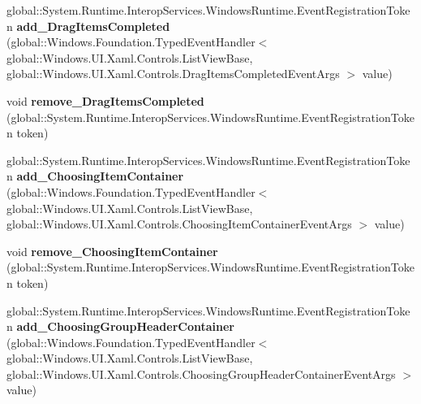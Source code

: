 \begin{DoxyCompactItemize}
\item 
\mbox{\label{interface_windows_1_1_u_i_1_1_xaml_1_1_controls_1_1_i_list_view_base4_a8ded6e3ecc87209cec3cfd04f4282042}} 
global\+::\+System.\+Runtime.\+Interop\+Services.\+Windows\+Runtime.\+Event\+Registration\+Token {\bfseries add\+\_\+\+Drag\+Items\+Completed} (global\+::\+Windows.\+Foundation.\+Typed\+Event\+Handler$<$ global\+::\+Windows.\+U\+I.\+Xaml.\+Controls.\+List\+View\+Base, global\+::\+Windows.\+U\+I.\+Xaml.\+Controls.\+Drag\+Items\+Completed\+Event\+Args $>$ value)
\item 
\mbox{\label{interface_windows_1_1_u_i_1_1_xaml_1_1_controls_1_1_i_list_view_base4_aa8eed7aa7eefe8deffed7275d822d4ea}} 
void {\bfseries remove\+\_\+\+Drag\+Items\+Completed} (global\+::\+System.\+Runtime.\+Interop\+Services.\+Windows\+Runtime.\+Event\+Registration\+Token token)
\item 
\mbox{\label{interface_windows_1_1_u_i_1_1_xaml_1_1_controls_1_1_i_list_view_base4_a50b9a86d32b7a6ba60f5162b251de868}} 
global\+::\+System.\+Runtime.\+Interop\+Services.\+Windows\+Runtime.\+Event\+Registration\+Token {\bfseries add\+\_\+\+Choosing\+Item\+Container} (global\+::\+Windows.\+Foundation.\+Typed\+Event\+Handler$<$ global\+::\+Windows.\+U\+I.\+Xaml.\+Controls.\+List\+View\+Base, global\+::\+Windows.\+U\+I.\+Xaml.\+Controls.\+Choosing\+Item\+Container\+Event\+Args $>$ value)
\item 
\mbox{\label{interface_windows_1_1_u_i_1_1_xaml_1_1_controls_1_1_i_list_view_base4_ae03f9cc1626fb8ce344e627e8be05680}} 
void {\bfseries remove\+\_\+\+Choosing\+Item\+Container} (global\+::\+System.\+Runtime.\+Interop\+Services.\+Windows\+Runtime.\+Event\+Registration\+Token token)
\item 
\mbox{\label{interface_windows_1_1_u_i_1_1_xaml_1_1_controls_1_1_i_list_view_base4_a676b16cd7663b4ae45652525cdbe9e66}} 
global\+::\+System.\+Runtime.\+Interop\+Services.\+Windows\+Runtime.\+Event\+Registration\+Token {\bfseries add\+\_\+\+Choosing\+Group\+Header\+Container} (global\+::\+Windows.\+Foundation.\+Typed\+Event\+Handler$<$ global\+::\+Windows.\+U\+I.\+Xaml.\+Controls.\+List\+View\+Base, global\+::\+Windows.\+U\+I.\+Xaml.\+Controls.\+Choosing\+Group\+Header\+Container\+Event\+Args $>$ value)

\end{DoxyCompactItemize}
